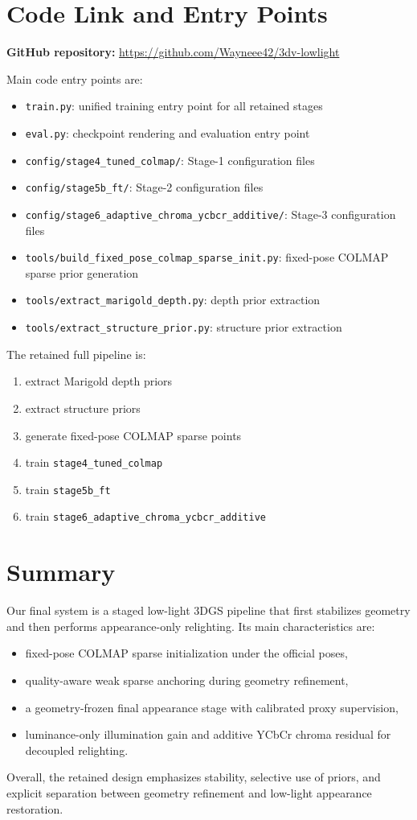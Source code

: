 \documentclass[10pt,a4paper]{article}
\begin{document}
\section{Code Link and Entry Points}
\textbf{GitHub repository:} \url{https://github.com/Wayneee42/3dv-lowlight}

Main code entry points are:
\begin{itemize}[leftmargin=2em]
  \item \texttt{train.py}: unified training entry point for all retained stages
  \item \texttt{eval.py}: checkpoint rendering and evaluation entry point
  \item \texttt{config/stage4\_tuned\_colmap/}: Stage-1 configuration files
  \item \texttt{config/stage5b\_ft/}: Stage-2 configuration files
  \item \texttt{config/stage6\_adaptive\_chroma\_ycbcr\_additive/}: Stage-3 configuration files
  \item \texttt{tools/build\_fixed\_pose\_colmap\_sparse\_init.py}: fixed-pose COLMAP sparse prior generation
  \item \texttt{tools/extract\_marigold\_depth.py}: depth prior extraction
  \item \texttt{tools/extract\_structure\_prior.py}: structure prior extraction
\end{itemize}

The retained full pipeline is:
\begin{enumerate}[leftmargin=2em]
  \item extract Marigold depth priors
  \item extract structure priors
  \item generate fixed-pose COLMAP sparse points
  \item train \texttt{stage4\_tuned\_colmap}
  \item train \texttt{stage5b\_ft}
  \item train \texttt{stage6\_adaptive\_chroma\_ycbcr\_additive}
\end{enumerate}

\section{Summary}
Our final system is a staged low-light 3DGS pipeline that first stabilizes geometry and then performs appearance-only relighting. Its main characteristics are:
\begin{itemize}[leftmargin=2em]
  \item fixed-pose COLMAP sparse initialization under the official poses,
  \item quality-aware weak sparse anchoring during geometry refinement,
  \item a geometry-frozen final appearance stage with calibrated proxy supervision,
  \item luminance-only illumination gain and additive YCbCr chroma residual for decoupled relighting.
\end{itemize}

Overall, the retained design emphasizes stability, selective use of priors, and explicit separation between geometry refinement and low-light appearance restoration.
\end{document}
